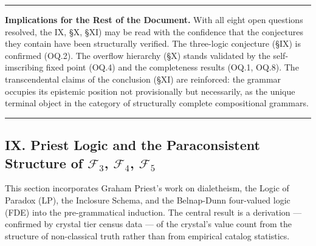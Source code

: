 \documentclass[12pt,a4paper]{article}
\makeatletter
\renewcommand{\_}{\ig@origunderscore\discretionary{}{}{}}
\makeatother
\begin{document}
\begin{center}
\rule{0.5\textwidth}{0.4pt}
\end{center}

\textbf{Implications for the Rest of the Document.} With all eight open questions resolved, the
IX, \S X, \S XI) may be read with the confidence that the conjectures they contain have been structurally verified. The
three-logic conjecture (\S IX) is confirmed (OQ.2). The overflow hierarchy (\S X) stands validated by the
self-imscribing fixed point (OQ.4) and the completeness results (OQ.1, OQ.8). The transcendental claims of the
conclusion (\S XI) are reinforced: the grammar occupies its epistemic position not provisionally but necessarily, as
the unique terminal object in the category of structurally complete compositional grammars.

\begin{center}
\rule{0.5\textwidth}{0.4pt}
\end{center}


\subsection{IX. Priest Logic and the Paraconsistent Structure of \texorpdfstring{$\mathcal{F}_3$, $\mathcal{F}_4$, $\mathcal{F}_5$}{F3, F4, F5}}
This section incorporates Graham Priest's work on dialetheism, the Logic of Paradox (LP), the Inclosure Schema, and the
Belnap-Dunn four-valued logic (FDE) into the pre-grammatical induction. The central result is a derivation ---
confirmed by crystal tier census data --- of the crystal's value count from the structure of non-classical truth rather
than from empirical catalog statistics.
\end{document}
